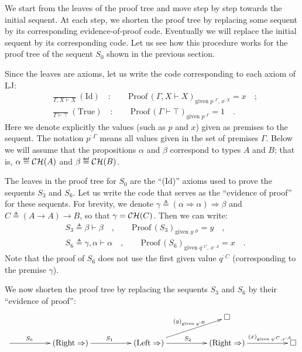 We start from the leaves of the proof tree and move step by step towards
the initial sequent. At each step, we shorten the proof tree by replacing
some sequent by its corresponding evidence-of-proof code. Eventually
we will replace the initial sequent by its corresponding code. Let
us see how this procedure works for the proof tree of the sequent
$S_{0}$ shown in the previous section.

Since the leaves are axioms, let us write the code corresponding to
each axiom of LJ:
\begin{align*}
 & \frac{}{\Gamma,X\vdash X}~(\text{Id})\quad:\quad\quad\text{Proof}\,(\Gamma,X\vdash X)_{\text{given }p^{:\Gamma},\,x^{:X}}=x\quad;\\
 & \frac{}{\Gamma\vdash\top}~(\text{True})\quad:\quad\quad\text{Proof}\,(\Gamma\vdash\top)_{\text{given }p^{:\Gamma}}=1\quad.
\end{align*}
Here we denote explicitly the values (such as $p$ and $x$) given
as premises to the sequent. The notation $p^{:\Gamma}$ means all
values given in the set of premises $\Gamma$. Below we will assume
that the propositions $\alpha$ and $\beta$ correspond to types $A$
and $B$; that is, $\alpha\triangleq{\cal CH}(A)$ and $\beta\triangleq{\cal CH}(B)$.

The leaves in the proof tree for $S_{0}$ are the \textsf{``}($\text{Id}$)\textsf{''}
axioms used to prove the sequents $S_{3}$ and $S_{6}$. Let us write
the code that serves as the \textsf{``}evidence of proof\textsf{''} for these sequents.
For brevity, we denote $\gamma\triangleq\left(\alpha\Rightarrow\alpha\right)\Rightarrow\beta$
and $C\triangleq\left(A\rightarrow A\right)\rightarrow B$, so that
$\gamma={\cal CH}(C)$. Then we can write:
\begin{align*}
 & S_{3}\triangleq\beta\vdash\beta\quad,\quad\quad\text{Proof}\,(S_{3})_{\text{given }y^{:B}}=y\quad,\\
 & S_{6}\triangleq\gamma,\alpha\vdash\alpha\quad,\quad\quad\text{Proof}\,(S_{6})_{\text{given }q^{:C},\,x^{:A}}=x\quad.
\end{align*}
Note that the proof of $S_{6}$ does not use the first given value
$q^{:C}$ (corresponding to the premise $\gamma$).

We now shorten the proof tree by replacing the sequents $S_{3}$ and
$S_{6}$ by their \textsf{``}evidence of proof\textsf{''}:
\[
\xymatrix{\xyScaleY{1.5pc}\xyScaleX{4.2pc} &  &  & \square\\
\ar[r]\sp(0.35){S_{0}} & (\text{Right}\Rightarrow)\ar[r]\sp(0.5){S_{1}} & (\text{Left}\Rightarrow)\ar[r]\sp(0.5){S_{2}}\ar[ru]\sp(0.6){(y)_{\text{given }y^{:B}}} & (\text{Right}\Rightarrow)\ar[r]\sp(0.65){(x)_{\text{given }q^{:C},x^{:A}}} & \square
}
\]

